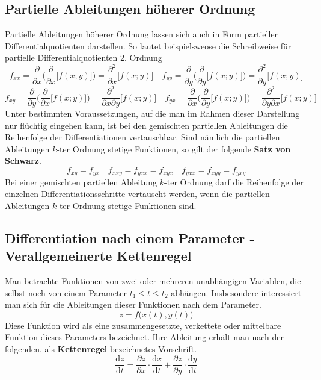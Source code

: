 \subsection{Partielle Ableitungen höherer Ordnung}
Partielle Ableitungen höherer Ordnung lassen sich auch in Form partieller Differentialquotienten darstellen. So lautet beispielsweose die Schreibweise für partielle Differentialquotienten 2. Ordnung
\begin{equation}
\boxed{f_{xx}=\dfrac{\partial}{\partial x}\Big(\dfrac{\partial}{\partial x}\Big[f\left(x; y\right)\Big]\Big)=\dfrac{\partial^2}{\partial x}\Big[f\left(x; y\right)\Big]}\quad \boxed{f_{yy}=\dfrac{\partial}{\partial y}\Big(\dfrac{\partial}{\partial y}\Big[f\left(x; y\right)\Big]\Big)=\dfrac{\partial^2}{\partial y}\Big[f\left(x; y\right)\Big]}
\end{equation}
\begin{equation}
\boxed{f_{xy}=\dfrac{\partial}{\partial y}\Big(\dfrac{\partial}{\partial x}\Big[f\left(x; y\right)\Big]\Big)=\dfrac{\partial^2}{\partial x \partial y}\Big[f\left(x; y\right)\Big]}\quad \boxed{f_{yx}=\dfrac{\partial}{\partial x}\Big(\dfrac{\partial}{\partial y}\Big[f\left(x; y\right)\Big]\Big)=\dfrac{\partial^2}{\partial y\partial x}\Big[f\left(x; y\right)\Big]}
\end{equation}
Unter bestimmten Voraussetzungen, auf die man im Rahmen dieser Darstellung nur flüchtig eingehen kann, ist bei den gemischten partiellen Ableitungen die Reihenfolge der Differentiationen vertauschbar. Sind nämlich die partiellen Ableitungen $k$-ter Ordnung stetige Funktionen, so gilt der folgende \textbf{Satz von Schwarz}. 
\begin{equation}
\boxed{f_{xy}=f_{yx}}\quad \boxed{f_{xxy}=f_{yxx}=f_{xyx}}\quad \boxed{f_{yxx}=f_{xyy}=f_{yxy}}
\end{equation}
Bei einer gemischten partiellen Ableitung $k$-ter Ordnung darf die Reihenfolge der einzelnen Differentiationsschritte vertauscht werden, wenn die partiellen Ableitungen $k$-ter Ordnung stetige Funktionen sind.
\subsection{Differentiation nach einem Parameter - Verallgemeinerte Kettenregel}
Man betrachte Funktionen von zwei oder mehreren unabhängigen Variablen, die selbst noch von einem Parameter $t_1\leq t\leq t_2$ abhängen. Insbesondere interessiert man sich für die Ableitungen dieser Funktionen nach dem Parameter.
\begin{equation}
\boxed{z=f\Big(x\left(t\right), y\left(t\right)\Big)}
\end{equation}
Diese Funktion wird als eine zusammengesetzte, verkettete oder mittelbare Funktion dieses Parameters bezeichnet. Ihre Ableitung erhält man nach der folgenden, als \textbf{Kettenregel} bezeichnetes Vorschrift.
\begin{equation}
\boxed{\dfrac{\text{d}z}{\text{d}t}=\dfrac{\partial z}{\partial x}\cdot \dfrac{\text{d}x}{\text{d}t}+\dfrac{\partial z}{\partial y}\cdot \dfrac{\text{d}y}{\text{d}t}}
\end{equation}
